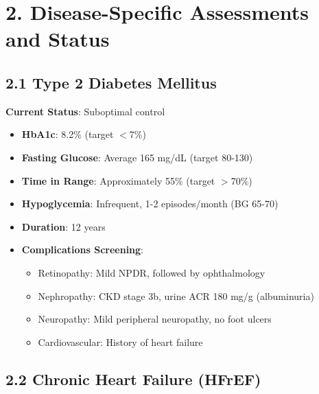 \documentclass[11pt,letterpaper]{article}
\begin{document}
\section*{2. Disease-Specific Assessments and Status}

\subsection*{2.1 Type 2 Diabetes Mellitus}

\textbf{Current Status}: Suboptimal control
\begin{itemize}[leftmargin=*]
    \item \textbf{HbA1c}: 8.2\% (target $<$7\%)
    \item \textbf{Fasting Glucose}: Average 165 mg/dL (target 80-130)
    \item \textbf{Time in Range}: Approximately 55\% (target $>$70\%)
    \item \textbf{Hypoglycemia}: Infrequent, 1-2 episodes/month (BG 65-70)
    \item \textbf{Duration}: 12 years
    \item \textbf{Complications Screening}:
    \begin{itemize}
        \item Retinopathy: Mild NPDR, followed by ophthalmology
        \item Nephropathy: CKD stage 3b, urine ACR 180 mg/g (albuminuria)
        \item Neuropathy: Mild peripheral neuropathy, no foot ulcers
        \item Cardiovascular: History of heart failure
    \end{itemize}
\end{itemize}

\subsection*{2.2 Chronic Heart Failure (HFrEF)}
\end{document}
